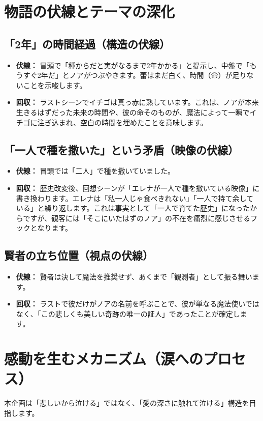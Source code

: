 \clearpage\section{物語の伏線とテーマの深化}

\subsection{「2年」の時間経過（構造の伏線）}
\begin{itemize}
    \item \textbf{伏線：} 冒頭で「種からだと実がなるまで2年かかる」と提示し、中盤で「もうすぐ2年だ」とノアがつぶやきます。蕾はまだ白く、時間（命）が足りないことを示唆します。
    \item \textbf{回収：} ラストシーンでイチゴは真っ赤に熟しています。これは、ノアが本来生きるはずだった未来の時間や、彼の命そのものが、魔法によって一瞬でイチゴに注ぎ込まれ、空白の時間を埋めたことを意味します。
\end{itemize}

\subsection{「一人で種を撒いた」という矛盾（映像の伏線）}
\begin{itemize}
    \item \textbf{伏線：} 冒頭では「二人」で種を撒いていました。
    \item \textbf{回収：} 歴史改変後、回想シーンが「エレナが一人で種を撒いている映像」に書き換わります。エレナは「私一人じゃ食べきれない」「一人で持て余している」と繰り返します。これは事実として「一人で育てた歴史」になったからですが、観客には「そこにいたはずのノア」の不在を痛烈に感じさせるフックとなります。
\end{itemize}

\subsection{賢者の立ち位置（視点の伏線）}
\begin{itemize}
\item \textbf{伏線：} 賢者は決して魔法を推奨せず、あくまで「観測者」として振る舞います。
\item \textbf{回収：} ラストで彼だけがノアの名前を呼ぶことで、彼が単なる魔法使いではなく、「この悲しくも美しい奇跡の唯一の証人」であったことが確定します。
\end{itemize}

\clearpage\section{感動を生むメカニズム（涙へのプロセス）}
本企画は「悲しいから泣ける」ではなく、「愛の深さに触れて泣ける」構造を目指します。

